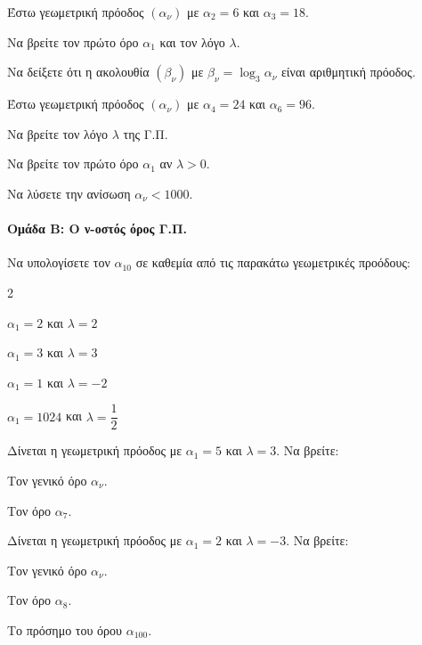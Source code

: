 \documentclass[11pt,a4paper,modern]{FFExercises}
\begin{document}
\askhsh
Έστω γεωμετρική πρόοδος $(\alpha_\nu)$ με $\alpha_2 = 6$ και $\alpha_3 = 18$.
\begin{alist}
  \item Να βρείτε τον πρώτο όρο $\alpha_1$ και τον λόγο $\lambda$.
  \item Να δείξετε ότι η ακολουθία $(\beta_\nu)$ με $\beta_\nu = \log_3 \alpha_\nu$ είναι αριθμητική πρόοδος.
\end{alist}

\askhsh
Έστω γεωμετρική πρόοδος $(\alpha_\nu)$ με $\alpha_4 = 24$ και $\alpha_6 = 96$.
\begin{alist}
  \item Να βρείτε τον λόγο $\lambda$ της Γ.Π.
  \item Να βρείτε τον πρώτο όρο $\alpha_1$ αν $\lambda > 0$.
  \item Να λύσετε την ανίσωση $\alpha_\nu < 1000$.
\end{alist}


\paragraph{Ομάδα Β: Ο ν-οστός όρος Γ.Π.}

\askhsh
Να υπολογίσετε τον $\alpha_{10}$ σε καθεμία από τις παρακάτω γεωμετρικές προόδους:
\begin{multicols}{2}
\begin{alist}
  \item $\alpha_1 = 2$ και $\lambda = 2$
  \item $\alpha_1 = 3$ και $\lambda = 3$
  \item $\alpha_1 = 1$ και $\lambda = -2$
  \item $\alpha_1 = 1024$ και $\lambda = \dfrac{1}{2}$
\end{alist}
\end{multicols}

\askhsh
Δίνεται η γεωμετρική πρόοδος με $\alpha_1 = 5$ και $\lambda = 3$. Να βρείτε:
\begin{alist}
  \item Τον γενικό όρο $\alpha_\nu$.
  \item Τον όρο $\alpha_7$.
\end{alist}

\askhsh
Δίνεται η γεωμετρική πρόοδος με $\alpha_1 = 2$ και $\lambda = -3$. Να βρείτε:
\begin{alist}
  \item Τον γενικό όρο $\alpha_\nu$.
  \item Τον όρο $\alpha_8$.
  \item Το πρόσημο του όρου $\alpha_{100}$.
\end{alist}
\end{document}

